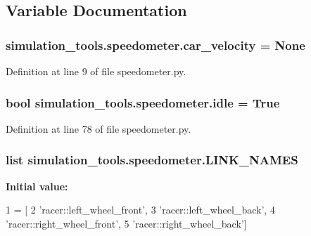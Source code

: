 \subsection{Variable Documentation}
\subsubsection[{\texorpdfstring{car\+\_\+velocity}{car_velocity}}]{\setlength{\rightskip}{0pt plus 5cm}simulation\+\_\+tools.\+speedometer.\+car\+\_\+velocity = None}\hypertarget{namespacesimulation__tools_1_1speedometer_a58c9137e8b8cf3668ebac7ca01fa1bc9}{}\label{namespacesimulation__tools_1_1speedometer_a58c9137e8b8cf3668ebac7ca01fa1bc9}


Definition at line 9 of file speedometer.\+py.

\subsubsection[{\texorpdfstring{idle}{idle}}]{\setlength{\rightskip}{0pt plus 5cm}bool simulation\+\_\+tools.\+speedometer.\+idle = True}\hypertarget{namespacesimulation__tools_1_1speedometer_a7cadcb55f200a548ddc3de34bf4792e1}{}\label{namespacesimulation__tools_1_1speedometer_a7cadcb55f200a548ddc3de34bf4792e1}


Definition at line 78 of file speedometer.\+py.

\subsubsection[{\texorpdfstring{L\+I\+N\+K\+\_\+\+N\+A\+M\+ES}{LINK_NAMES}}]{\setlength{\rightskip}{0pt plus 5cm}list simulation\+\_\+tools.\+speedometer.\+L\+I\+N\+K\+\_\+\+N\+A\+M\+ES}\hypertarget{namespacesimulation__tools_1_1speedometer_a814c56b4196e3629a065df33256daab8}{}\label{namespacesimulation__tools_1_1speedometer_a814c56b4196e3629a065df33256daab8}
{\bfseries Initial value\+:}
\begin{DoxyCode}
1 = [
2     \textcolor{stringliteral}{'racer::left\_wheel\_front'},
3     \textcolor{stringliteral}{'racer::left\_wheel\_back'},
4     \textcolor{stringliteral}{'racer::right\_wheel\_front'},
5     \textcolor{stringliteral}{'racer::right\_wheel\_back'}]
\end{DoxyCode}


